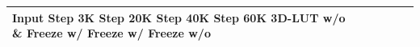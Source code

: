\begin{tabular}{llllll}
\toprule
Input Step 3K Step 20K Step 40K Step 60K 3D-LUT w/o \& Freeze w/ Freeze w/ Freeze w/o &  &  &  &  &  \\
\midrule
\bottomrule
\end{tabular}
